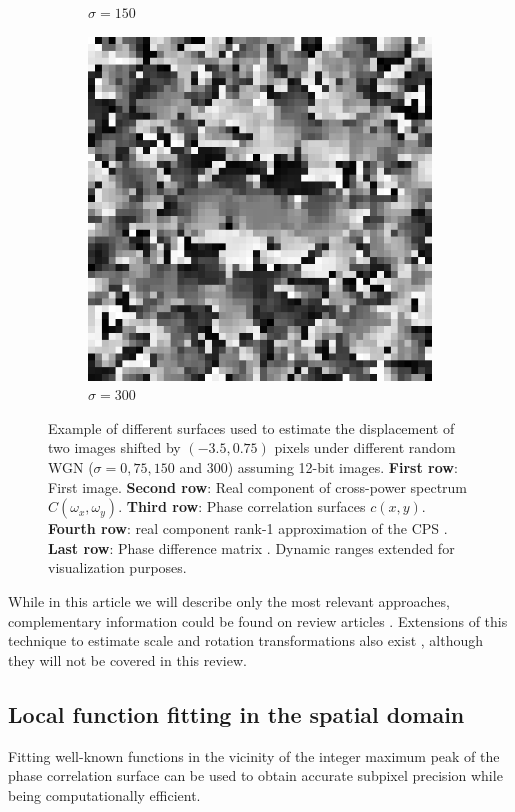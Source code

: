 \begin{figure}[htpb]
\begin{subfigure}{.25\textwidth}
\caption{$\sigma = 150$}
\end{subfigure}%
\begin{subfigure}{.25\textwidth}
\includegraphics[width=1\textwidth]{img/PhaseDifferenceSigma300}
\caption{$\sigma = 300$}
\end{subfigure}
\caption{Example of different surfaces used to estimate the displacement of two images shifted by $(-3.5, 0.75)$ pixels under different random WGN ($\sigma=0,75,150$ and $300$) assuming 12-bit images. \textbf{First row}: First image. \textbf{Second row}: Real component of cross-power spectrum $C(\omega_x, \omega_y)$. \textbf{Third row}: Phase correlation surfaces $c(x,y)$. \textbf{Fourth row}: real component rank-1 approximation of the CPS \cite{Hoge_2003}. \textbf{Last row}: Phase difference matrix \cite{Stone_2001}. Dynamic ranges extended for visualization purposes.}
\label{fig:phaseCorrelationNoisy}
\end{figure}

While in this article we will describe only the most relevant approaches, complementary information could be found on review articles \cite{reed2010comparison, Alba_2015}. Extensions of this technique to estimate scale and rotation transformations also exist \cite{Reddy1996}, although they will not be covered in this review.

\subsection{Local function fitting in the spatial domain}
\label{subsec:phaseCorrelationLocalFunctionFitting}
Fitting well-known functions in the vicinity of the integer maximum peak of the phase correlation surface can be used to obtain accurate subpixel precision while being computationally efficient. 

